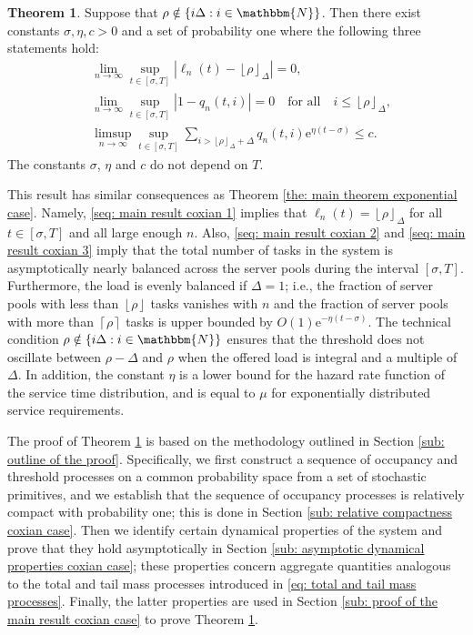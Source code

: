 \documentclass[a4paper, 12pt]{article}
\theoremstyle{definition}
\newtheorem{theorem}{Theorem}
\newcommand{\floor}[1]{\left\lfloor#1\right\rfloor}
\newcommand{\ceil}[1]{\left\lceil#1\right\rceil}
\newcommand{\set}[2]{\left\{#1 : #2\right\}}
\newcommand{\N}{\mathbbm{N}}
\newcommand{\e}{\mathrm{e}}
\begin{document}
\begin{theorem}
	\label{the: main theorem coxian case}
	Suppose that $\rho \notin \set{i\Delta}{i \in \N}$. Then there exist constants $\sigma, \eta, c > 0$ and a set of probability one where the following three statements hold:
	\begin{subequations}
		\begin{align}
			&\lim_{n \to \infty} \sup_{t \in [\sigma, T]} |\ell_n(t) - \floor{\rho}_\Delta| = 0, \label{seq: main result coxian 1} \\
			&\lim_{n \to \infty} \sup_{t \in [\sigma, T]} \left|1 - q_n(t, i)\right| = 0 \quad \text{for all} \quad i \leq \floor{\rho}_\Delta, \label{seq: main result coxian 2} \\
			&\limsup_{n \to \infty} \sup_{t \in [\sigma, T]} \sum_{i > \floor{\rho}_\Delta + \Delta} q_n(t, i)\e^{\eta\left(t - \sigma\right)} \leq c. \label{seq: main result coxian 3}
		\end{align} 
	\end{subequations}
	The constants $\sigma$, $\eta$ and $c$ do not depend on $T$.
\end{theorem}

This result has similar consequences as Theorem \ref{the: main theorem exponential case}. Namely, \eqref{seq: main result coxian 1} implies that $\ell_n(t) = \floor{\rho}_\Delta$ for all $t \in [\sigma, T]$ and all large enough $n$. Also, \eqref{seq: main result coxian 2} and \eqref{seq: main result coxian 3} imply that the total number of tasks in the system is asymptotically nearly balanced across the server pools during the interval $[\sigma, T]$. Furthermore, the load is evenly balanced if $\Delta = 1$; i.e., the fraction of server pools with less than $\floor{\rho}$ tasks vanishes with $n$ and the fraction of server pools with more than $\ceil{\rho}$ tasks is upper bounded by $O(1)\e^{-\eta(t - \sigma)}$. The technical condition $\rho \notin \set{i\Delta}{i \in \N}$ ensures that the threshold does not oscillate between $\rho - \Delta$ and $\rho$ when the offered load is integral and a multiple of $\Delta$. In addition, the constant $\eta$ is a lower bound for the hazard rate function of the service time distribution, and is equal to $\mu$ for exponentially distributed service requirements.

The proof of Theorem \ref{the: main theorem coxian case} is based on the methodology outlined in Section \ref{sub: outline of the proof}. Specifically, we first construct a sequence of occupancy and threshold processes on a common probability space from a set of stochastic primitives, and we establish that the sequence of occupancy processes is relatively compact with probability one; this is done in Section \ref{sub: relative compactness coxian case}. Then we identify certain dynamical properties of the system and prove that they hold asymptotically in Section \ref{sub: asymptotic dynamical properties coxian case}; these properties concern aggregate quantities analogous to the total and tail mass processes introduced in \eqref{eq: total and tail mass processes}. Finally, the latter properties are used in Section \ref{sub: proof of the main result coxian case} to prove Theorem \ref{the: main theorem coxian case}.
\end{document}

